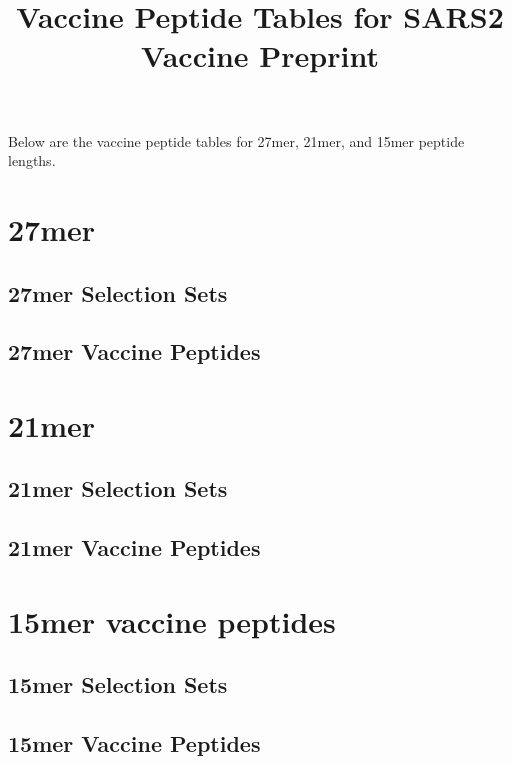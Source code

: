 \documentclass{article}
\title{Vaccine Peptide Tables for SARS2 Vaccine Preprint}
\begin{document}
Below are the vaccine peptide tables for 27mer, 21mer, and 15mer peptide lengths.

\section{27mer}
\subsection{27mer Selection Sets}

\subsection{27mer Vaccine Peptides}


\section{21mer}
\subsection{21mer Selection Sets}

\subsection{21mer Vaccine Peptides}


\section{15mer vaccine peptides}
\subsection{15mer Selection Sets}

\subsection{15mer Vaccine Peptides}

\end{document}
